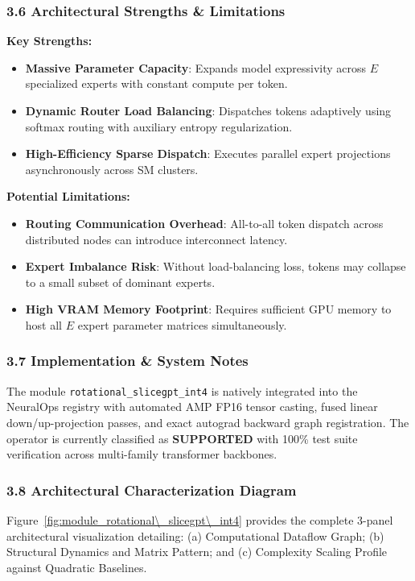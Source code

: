 \subsubsection*{3.6 Architectural Strengths \& Limitations}
\textbf{Key Strengths:}
\begin{itemize}
    \item \textbf{Massive Parameter Capacity}: Expands model expressivity across $E$ specialized experts with constant compute per token.
    \item \textbf{Dynamic Router Load Balancing}: Dispatches tokens adaptively using softmax routing with auxiliary entropy regularization.
    \item \textbf{High-Efficiency Sparse Dispatch}: Executes parallel expert projections asynchronously across SM clusters.
\end{itemize}

\textbf{Potential Limitations:}
\begin{itemize}
    \item \textbf{Routing Communication Overhead}: All-to-all token dispatch across distributed nodes can introduce interconnect latency.
    \item \textbf{Expert Imbalance Risk}: Without load-balancing loss, tokens may collapse to a small subset of dominant experts.
    \item \textbf{High VRAM Memory Footprint}: Requires sufficient GPU memory to host all $E$ expert parameter matrices simultaneously.
\end{itemize}

\subsubsection*{3.7 Implementation \& System Notes}
The module \texttt{rotational\_slicegpt\_int4} is natively integrated into the NeuralOps registry with automated AMP FP16 tensor casting, fused linear down/up-projection passes, and exact autograd backward graph registration. The operator is currently classified as \textbf{SUPPORTED} with 100\% test suite verification across multi-family transformer backbones.

\subsubsection*{3.8 Architectural Characterization Diagram}
Figure~\ref{fig:module_rotational\_slicegpt\_int4} provides the complete 3-panel architectural visualization detailing: (a) Computational Dataflow Graph; (b) Structural Dynamics and Matrix Pattern; and (c) Complexity Scaling Profile against Quadratic Baselines.

